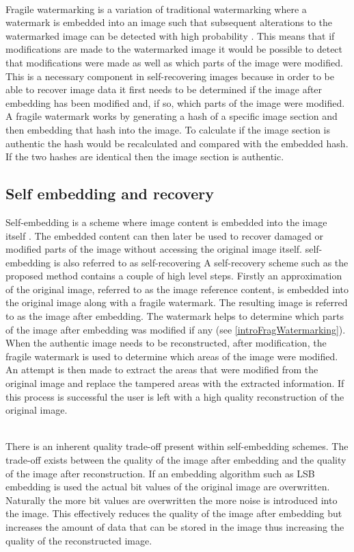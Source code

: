 \documentclass[12pt]{article}
\begin{document}
\hspace{0pt} \\
Fragile watermarking is a variation of traditional watermarking where a watermark is embedded into an image such that subsequent alterations to the watermarked image can be detected with high probability \cite{lin1999review}.
This means that if modifications are made to the watermarked image it would be possible to detect that modifications were made as well as which parts of the image were modified.
This is a necessary component in self-recovering images because in order to be able to recover image data it first needs to be determined if the image after embedding has been modified and, if so, which parts of the image were modified.
A fragile watermark works by generating a hash of a specific image section and then embedding that hash into the image.
To calculate if the image section is authentic the hash would be recalculated and compared with the embedded hash.
If the two hashes are identical then the image section is authentic. 

\subsection{Self embedding and recovery}
\label{introSelfEmbedRecovery}
Self-embedding is a scheme where image content is embedded into the image itself \cite{fridrich1999images}. The embedded content can then later be used to recover damaged or modified parts of the image without accessing the original image itself.
self-embedding is also referred to as self-recovering
A self-recovery scheme such as the proposed method contains a couple of high level steps.
Firstly an approximation of the original image, referred to as the image reference content, is embedded into the original image along with a fragile watermark.
The resulting image is referred to as the image after embedding.
The watermark helps to determine which parts of the image after embedding was modified if any (see \ref{introFragWatermarking}).
When the authentic image needs to be reconstructed, after modification, the fragile watermark is used to determine which areas of the image were modified.
An attempt is then made to extract the areas that were modified from the original image and replace the tampered areas with the extracted information.
If this process is successful the user is left with a high quality reconstruction of the original image.

\hspace{0pt} \\
There is an inherent quality trade-off present within self-embedding schemes.
The trade-off exists between the quality of the  image after embedding and the quality of the image after reconstruction.
If an embedding algorithm such as LSB embedding is used the actual bit values of the original image are overwritten.
Naturally the more bit values are overwritten the more noise is introduced into the image.
This effectively reduces the quality of the image after embedding but increases the amount of data that can be stored in the image thus increasing the quality of the reconstructed image.
\end{document}
